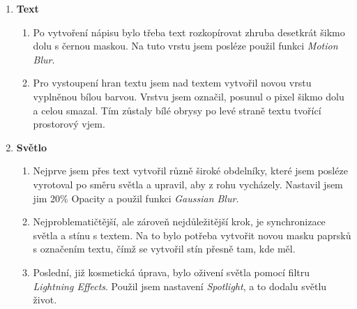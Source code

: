 \begin{enumerate}
	\item {\bf Text}
	\begin{enumerate}
		\item Po vytvoření nápisu bylo třeba text rozkopírovat zhruba desetkrát šikmo dolu s černou maskou. Na tuto vrstu jsem posléze použil funkci \emph{Motion Blur}.
		\item Pro vystoupení hran textu jsem nad textem vytvořil novou vrstu vyplněnou bílou barvou. Vrstvu jsem označil, posunul o pixel šikmo dolu a celou smazal. Tím zůstaly bílé obrysy po levé straně textu tvořící prostorový vjem.
	\end{enumerate}
	\item {\bf Světlo}
	\begin{enumerate}
		\item Nejprve jsem přes text vytvořil různě široké obdelníky, které jsem posléze vyrotoval po směru světla a upravil, aby z rohu vycházely. Nastavil jsem jim 20\% Opacity a použil funkci \emph{Gaussian Blur}.
		\item Nejproblematičtější, ale zároveň nejdůležitější krok, je synchronizace světla a stínu s textem. Na to bylo potřeba vytvořit novou masku paprsků s označením textu, čímž se vytvořil stín přesně tam, kde měl.
		\item Poslední, již kosmetická úprava, bylo oživení světla pomocí filtru \emph{Lightning Effects}. Použil jsem nastavení \emph{Spotlight}, a to dodalu světlu život.
	\end{enumerate}
\end{enumerate}